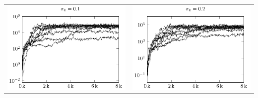 \begin{tabular}{@{}l@{}l@{}}
\includegraphics[scale=1]{plots/cma_initial_sigma_0_1} &
\includegraphics[scale=1]{plots/cma_initial_sigma_0_2}
\end{tabular}


